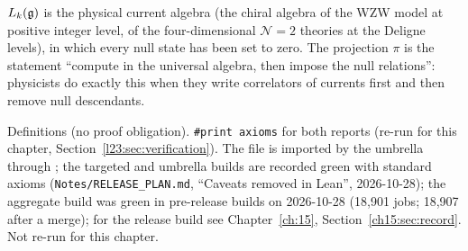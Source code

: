\begin{physics}
$L_k(\mathfrak g)$ is the physical current algebra (the chiral algebra of the WZW model at positive integer level, of the
four-dimensional $\mathcal N=2$ theories at the Deligne levels), in which every null state has been set to zero. The projection
$\pi$ is the statement ``compute in the universal algebra, then impose the null relations'': physicists do exactly this when they
write correlators of currents first and then remove null descendants.
\end{physics}

\begin{status}
Definitions (no proof obligation). \texttt{\#print axioms} for both reports  (re-run for
this chapter, Section~\ref{l23:sec:verification}). The file is imported by the umbrella through
; the targeted and umbrella builds are recorded green with standard axioms
(\texttt{Notes/RELEASE\_PLAN.md}, ``Caveats removed in Lean'', 2026-10-28); the aggregate build was green in pre-release builds on 2026-10-28
(18{,}901 jobs; 18{,}907 after a merge); for the release build see Chapter~\ref{ch:15}, Section~\ref{ch15:sec:record}. Not re-run for this chapter.
\end{status}

